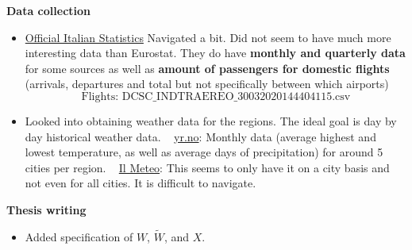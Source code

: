 \documentclass{article}
\begin{document}
\begin{itemize}
	\textbf{Data collection}
		\begin{itemize}
			\item \href{http://dati.istat.it/}{Official Italian Statistics} Navigated a bit. Did not seem to have much more interesting data than Eurostat. They do have \textbf{monthly and quarterly data} for some sources as well as \textbf{amount of passengers for domestic flights} (arrivals, departures and total but not specifically between which airports)
				\[\text{Flights: DCSC\_INDTRAEREO\_30032020144404115.csv}\]
			\item Looked into obtaining weather data for the regions. The ideal goal is day by day historical weather data.
				\subitem \textbullet~ \href{https://www.yr.no/place/Italy}{yr.no}: Monthly data (average highest and lowest temperature, as well as average days of precipitation) for around 5 cities per region.
				\subitem \textbullet~ \href{https://www.ilmeteo.it/portale/archivio-meteo}{Il Meteo}: This seems to only have it on a city basis and not even for all cities. It is difficult to navigate.
		\end{itemize}
	
	\textbf{Thesis writing}
	\begin{itemize}
		\item Added specification of $W$, $\widetilde{W}$, and $X$.
	\end{itemize}
	

\end{itemize}
\end{document}
